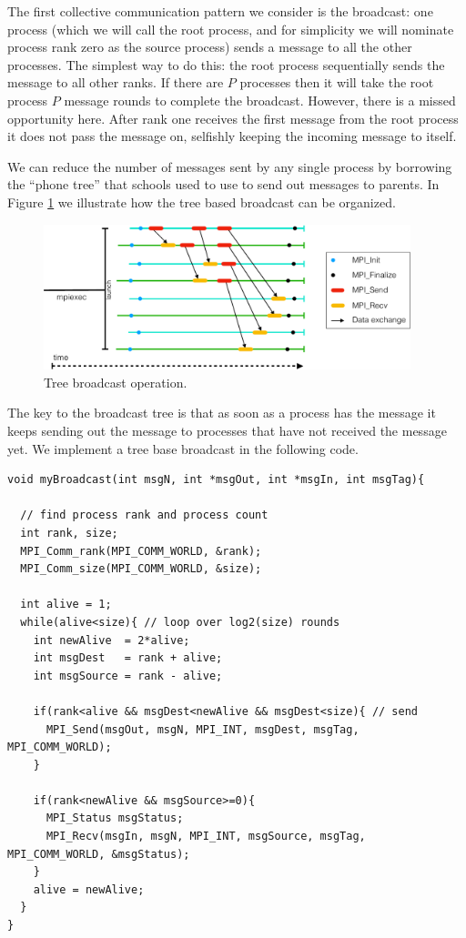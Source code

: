 The first collective communication pattern we consider is the broadcast: one process (which we will call the root process, and for simplicity we will nominate process rank zero as the source process) sends a message to all the other processes. The simplest way to do this:  the root process sequentially sends the message to all other ranks. If there are $P$ processes then it will take the root process $P$ message rounds to complete the broadcast. However, there is a missed opportunity here. After rank one receives the first message from the root process it does not pass the message on, selfishly keeping the incoming message to itself.

We can reduce the number of messages sent by any single process by  borrowing the ``phone tree'' that schools used to use to send out messages to parents. In Figure \ref{broadcast.fig} we illustrate how the tree based broadcast can be organized. 

\begin{figure}[htbp!]
    \centering
    \includegraphics[width=0.95\textwidth]{figures/L19/CMDA3634FA19Broadcast-crop.pdf}
    \caption{Tree broadcast operation.}
    \label{broadcast.fig}
\end{figure}

The key to the broadcast tree is that as soon as a process has the message it keeps sending out the message to processes that have not received the message yet. We implement a tree base broadcast in the following code.

\begin{verbatim}
void myBroadcast(int msgN, int *msgOut, int *msgIn, int msgTag){

  // find process rank and process count      
  int rank, size;
  MPI_Comm_rank(MPI_COMM_WORLD, &rank);
  MPI_Comm_size(MPI_COMM_WORLD, &size);

  int alive = 1;
  while(alive<size){ // loop over log2(size) rounds    
    int newAlive  = 2*alive;
    int msgDest   = rank + alive;
    int msgSource = rank - alive;

    if(rank<alive && msgDest<newAlive && msgDest<size){ // send   
      MPI_Send(msgOut, msgN, MPI_INT, msgDest, msgTag, MPI_COMM_WORLD);
    }

    if(rank<newAlive && msgSource>=0){
      MPI_Status msgStatus;
      MPI_Recv(msgIn, msgN, MPI_INT, msgSource, msgTag, MPI_COMM_WORLD, &msgStatus);
    }
    alive = newAlive;
  }
}
\end{verbatim}


